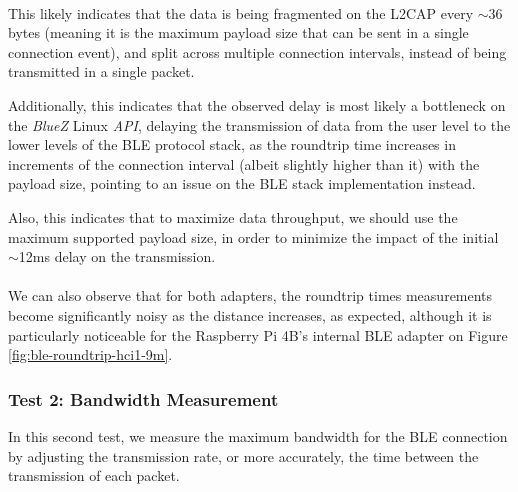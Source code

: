 \paragraph{} This likely indicates that the data is being fragmented on the \acs{L2CAP} every $\sim$36 bytes (meaning it is the maximum payload size that can be sent in a single connection event), and split across multiple connection intervals, instead of being transmitted in a single packet. 

Additionally, this indicates that the observed delay is most likely a bottleneck on the \textit{BlueZ} Linux \textit{API}, delaying the transmission of data from the user level to the lower levels of the \acs{BLE} protocol stack, as the roundtrip time increases in increments of the connection interval (albeit slightly higher than it) with the payload size, pointing to an issue on the \acs{BLE} stack implementation instead.

Also, this indicates that to maximize data throughput, we should use the maximum supported payload size, in order to minimize the impact of the initial $\sim$12ms delay on the transmission.
 
\paragraph{} We can also observe that for both adapters, the roundtrip times measurements become significantly noisy as the distance increases, as expected, although it is particularly noticeable for the Raspberry Pi 4B's internal \acs{BLE} adapter on Figure \ref{fig:ble-roundtrip-hci1-9m}. 

\paragraph{} 

\subsubsection{Test 2: Bandwidth Measurement}

In this second test, we measure the maximum bandwidth for the \acs{BLE} connection by adjusting the transmission rate, or more accurately, the time between the transmission of each packet. 

